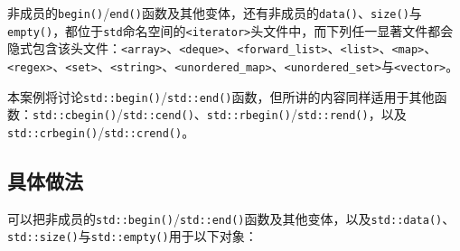 
非成员的\texttt{begin()}/\texttt{end()}函数及其他变体，还有非成员的\texttt{data()}、\texttt{size()}与\texttt{empty()}，都位于\texttt{std}命名空间的\texttt{<\allowbreak{}iterator>}头文件中，而下列任一显著文件都会隐式包含该头文件：\texttt{<\allowbreak{}array>}、\texttt{<\allowbreak{}deque>}、\texttt{<\allowbreak{}forward\_\allowbreak{}list>}、\texttt{<\allowbreak{}list>}、\texttt{<\allowbreak{}map>}、\texttt{<\allowbreak{}regex>}、\texttt{<\allowbreak{}set>}、\texttt{<\allowbreak{}string>}、\texttt{<\allowbreak{}unordered\_\allowbreak{}map>}、\texttt{<\allowbreak{}unordered\_\allowbreak{}set>}与\texttt{<\allowbreak{}vector>}。



本案例将讨论\texttt{std::\allowbreak{}begin()}/\texttt{std::\allowbreak{}end()}函数，但所讲的内容同样适用于其他函数：\texttt{std::\allowbreak{}cbegin()}/\texttt{std::\allowbreak{}cend()}、\texttt{std::\allowbreak{}rbegin()}/\texttt{std::\allowbreak{}rend()}，以及\texttt{std::\allowbreak{}crbegin()}/\texttt{std::\allowbreak{}crend()}。



\subsection{具体做法}



可以把非成员的\texttt{std::\allowbreak{}begin()}/\texttt{std::\allowbreak{}end()}函数及其他变体，以及\texttt{std::\allowbreak{}data()}、\texttt{std::\allowbreak{}size()}与\texttt{std::\allowbreak{}empty()}用于以下对象：



